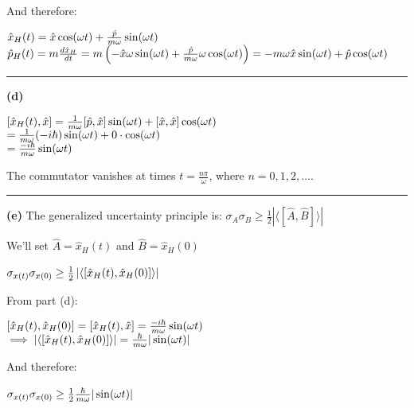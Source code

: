 \documentclass[14pt]{extarticle}
\makeatletter
\newenvironment{lefteqs}{%
    \begin{flushleft}%
    \renewcommand{\arraystretch}{1.3}%
    $\begin{array}{@{}l@{}}%
}{%
    \end{array}$%
    \end{flushleft}%
}
\makeatother
\begin{document}
And therefore:

\begin{lefteqs}
    \hat{x}_H(t) = \hat{x} \cos(\omega t) + \frac{\hat{p}}{m \omega} \sin(\omega t) \\
    \hat{p}_H(t) = m \frac{d \hat{x}_H}{dt} = m \left( -\hat{x} \omega \sin(\omega t) + \frac{\hat{p}}{m \omega} \omega \cos(\omega t) \right) = -m \omega \hat{x} \sin(\omega t) + \hat{p} \cos(\omega t) \\
\end{lefteqs}

\hrule
\vspace{2em}

\textbf{(d)}

\begin{lefteqs}
    [\hat{x}_H(t), \hat{x}] = \frac{1}{m\omega} [\hat{p}, \hat{x}] \sin(\omega t) + [\hat{x}, \hat{x}] \cos(\omega t) \\
    = \frac{1}{m\omega} (-i \hbar) \sin(\omega t) + 0 \cdot \cos(\omega t) \\
    = \frac{-i \hbar}{m\omega} \sin(\omega t)
\end{lefteqs}
The commutator vanishes at times $t = \frac{n \pi}{\omega}$, where $n = 0, 1, 2, \dots$.

\hrule
\vspace{2em}

\textbf{(e)}
The generalized uncertainty principle is: $\sigma_A \sigma_B \geq \frac{1}{2} |\langle [\hat{A}, \hat{B}] \rangle|$

We'll set $\hat{A} = \hat{x}_H(t)$ and $\hat{B} = \hat{x}_H(0)$

\begin{lefteqs}
    \sigma_{x(t)} \sigma_{x(0)} \geq \frac{1}{2} \left| \langle [\hat{x}_H(t), \hat{x}_H(0)] \rangle \right| \\
\end{lefteqs}

From part (d):
\begin{lefteqs}
    [\hat{x}_H(t), \hat{x}_H(0)] = [\hat{x}_H(t), \hat{x}] = \frac{-i \hbar}{m\omega} \sin(\omega t) \\
\implies \left| \langle [\hat{x}_H(t), \hat{x}_H(0)] \rangle \right| = \frac{\hbar}{m\omega} |\sin(\omega t)| \\
\end{lefteqs}

And therefore:
\begin{lefteqs}
    \sigma_{x(t)} \sigma_{x(0)} \geq \frac{1}{2} \frac{\hbar}{m\omega} |\sin(\omega t)| \\
\end{lefteqs}
\end{document}
